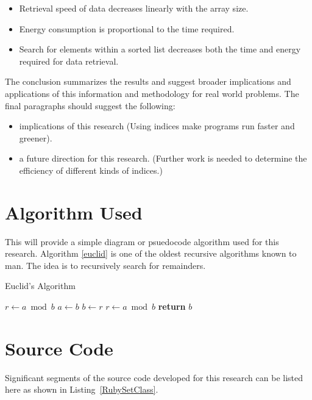 \documentclass[journal,12pt]{IEEEtran}
\begin{document}
\begin{itemize}
\item Retrieval speed of data decreases linearly with the array size.
\item Energy consumption is proportional to the time required.
\item Search for elements within a sorted list decreases both the time and energy required for data retrieval.
\end{itemize}

The conclusion summarizes the results and suggest broader implications and applications of this information and methodology for real world problems.
The final paragraphs should suggest the following:
 
 \begin{itemize}
 \item implications of this research (Using indices make programs run faster and greener).
 \item a future direction for this research. (Further work is needed to determine the efficiency of different kinds of indices.)
\end{itemize}

\appendices
\section{Algorithm Used}

This will provide a simple diagram or psuedocode algorithm used for this research. Algorithm \ref{euclid} is one of the oldest recursive algorithms known to man. The idea is to recursively search for remainders.

\begin{algorithm}[htb]
    \caption{Euclid's Algorithm}
    \label{euclid}
    \begin{algorithmic}[1] %
         
            \State $r\gets a \bmod b$
             
                \State $a \gets b$
                \State $b \gets r$
                \State $r \gets a \bmod b$
            \EndWhile\label{euclidendwhile}
            \State \textbf{return} $b$
        \EndProcedure
    \end{algorithmic}
\end{algorithm}

\section{Source Code}
Significant segments of the source code developed for this research can be listed here as shown in Listing~\ref{RubySetClass}. 
\end{document}
